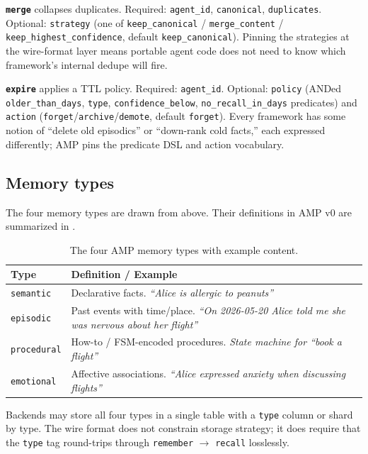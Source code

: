 \documentclass[11pt,letterpaper,twocolumn]{article}
\begin{document}
\textbf{\texttt{merge}} collapses duplicates. Required: \texttt{agent\_id}, \texttt{canonical}, \texttt{duplicates}. Optional: \texttt{strategy} (one of \texttt{keep\_canonical} / \texttt{merge\_content} / \texttt{keep\_highest\_confidence}, default \texttt{keep\_canonical}). Pinning the strategies at the wire-format layer means portable agent code does not need to know which framework's internal dedupe will fire.

\textbf{\texttt{expire}} applies a TTL policy. Required: \texttt{agent\_id}. Optional: \texttt{policy} (ANDed \texttt{older\_than\_days}, \texttt{type}, \texttt{confidence\_below}, \texttt{no\_recall\_in\_days} predicates) and \texttt{action} (\texttt{forget}/\texttt{archive}/\texttt{demote}, default \texttt{forget}). Every framework has some notion of ``delete old episodics'' or ``down-rank cold facts,'' each expressed differently; AMP pins the predicate DSL and action vocabulary.

\subsection{Memory types}
\label{sec:spec-types}

The four memory types are drawn from  above. Their definitions in AMP v0 are summarized in .

\begin{table}[t]
\centering
\caption{The four AMP memory types with example content.}
\label{tab:types}
\small
\begin{tabularx}{\columnwidth}{lX}
\toprule
\textbf{Type} & \textbf{Definition / Example} \\
\midrule
\texttt{semantic}   & Declarative facts. \emph{``Alice is allergic to peanuts''} \\
\texttt{episodic}   & Past events with time/place. \emph{``On 2026-05-20 Alice told me she was nervous about her flight''} \\
\texttt{procedural} & How-to / FSM-encoded procedures. \emph{State machine for ``book a flight''} \\
\texttt{emotional}  & Affective associations. \emph{``Alice expressed anxiety when discussing flights''} \\
\bottomrule
\end{tabularx}
\end{table}

Backends may store all four types in a single table with a \texttt{type} column or shard by type. The wire format does not constrain storage strategy; it does require that the \texttt{type} tag round-trips through \texttt{remember} $\rightarrow$ \texttt{recall} losslessly.
\end{document}
